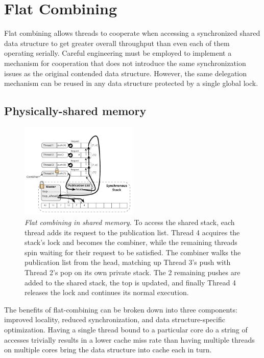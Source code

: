 \section{Flat Combining}

Flat combining allows threads to cooperate when accessing a synchronized shared data structure to get greater overall throughput than even each of them operating serially. Careful engineering must be employed to implement a mechanism for cooperation that does not introduce the same synchronization issues as the original contended data structure. However, the same delegation mechanism can be reused in any data structure protected by a single global lock. 

\subsection{Physically-shared memory}

\begin{figure}[ht]
  \centering
  \includegraphics[width=0.5\textwidth]{figs/fc_shared_mem.pdf}
  \caption{\emph{Flat combining in shared memory.}
    To access the shared stack, each thread adds its request to the publication list. Thread 4 acquires the stack's lock and becomes the combiner, while the remaining threads spin waiting for their request to be satisfied. The combiner walks the publication list from the head, matching up Thread 3's push with Thread 2's pop on its own private stack. The 2 remaining pushes are added to the shared stack, the top is updated, and finally Thread 4 releases the lock and continues its normal execution.
  }
  \label{fig:fc_shared_mem}
\end{figure}

The benefits of flat-combining can be broken down into three components: improved locality, reduced synchronization, and data structure-specific optimization. Having a single thread bound to a particular core do a string of accesses trivially results in a lower cache miss rate than having multiple threads on multiple cores bring the data structure into cache each in turn.

